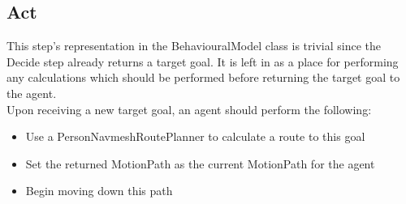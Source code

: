 \begin{algorithm}[H]
 \SetAlgoLined
\end{algorithm}

\subsection{Act}
This step's representation in the BehaviouralModel class is trivial since the Decide step already returns a target goal. It is left in as a place for performing any calculations which should be performed before returning the target goal to the agent.\\
Upon receiving a new target goal, an agent should perform the following:
\begin{itemize}
\item{Use a PersonNavmeshRoutePlanner to calculate a route to this goal}
\item{Set the returned MotionPath as the current MotionPath for the agent}
\item{Begin moving down this path}
\end{itemize}

%
     
     
 

    

